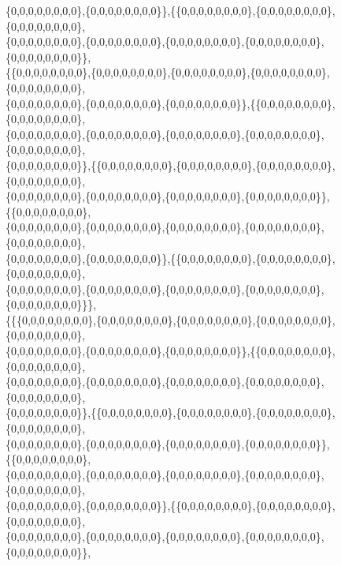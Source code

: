 \documentclass[a4paper,11pt]{jbook}
\theoremstyle{plain}
\theoremstyle{definition}
\theoremstyle{remark}
\theoremstyle{proof}
\numberwithin{equation}{section}
\begin{document}
\begin{doublespace}
\{0,0,0,0,0,0,0,0\},\{0,0,0,0,0,0,0,0\}\},\{\{0,0,0,0,0,0,0,0\},\{0,0,0,0,0,0,0,0\},\{0,0,0,0,0,0,0,0\}, \\
\{0,0,0,0,0,0,0,0\},\{0,0,0,0,0,0,0,0\},\{0,0,0,0,0,0,0,0\},\{0,0,0,0,0,0,0,0\},\{0,0,0,0,0,0,0,0\}\},\\
\{\{0,0,0,0,0,0,0,0\},\{0,0,0,0,0,0,0,0\},\{0,0,0,0,0,0,0,0\},\{0,0,0,0,0,0,0,0\},\{0,0,0,0,0,0,0,0\}, \\
\{0,0,0,0,0,0,0,0\},\{0,0,0,0,0,0,0,0\},\{0,0,0,0,0,0,0,0\}\},\{\{0,0,0,0,0,0,0,0\},\{0,0,0,0,0,0,0,0\}, \\
\{0,0,0,0,0,0,0,0\},\{0,0,0,0,0,0,0,0\},\{0,0,0,0,0,0,0,0\},\{0,0,0,0,0,0,0,0\},\{0,0,0,0,0,0,0,0\},\\
\{0,0,0,0,0,0,0,0\}\},\{\{0,0,0,0,0,0,0,0\},\{0,0,0,0,0,0,0,0\},\{0,0,0,0,0,0,0,0\},\{0,0,0,0,0,0,0,0\}, \\
\{0,0,0,0,0,0,0,0\},\{0,0,0,0,0,0,0,0\},\{0,0,0,0,0,0,0,0\},\{0,0,0,0,0,0,0,0\}\},\{\{0,0,0,0,0,0,0,0\}, \\
\{0,0,0,0,0,0,0,0\},\{0,0,0,0,0,0,0,0\},\{0,0,0,0,0,0,0,0\},\{0,0,0,0,0,0,0,0\},\{0,0,0,0,0,0,0,0\},\\
\{0,0,0,0,0,0,0,0\},\{0,0,0,0,0,0,0,0\}\},\{\{0,0,0,0,0,0,0,0\},\{0,0,0,0,0,0,0,0\},\{0,0,0,0,0,0,0,0\}, \\
\{0,0,0,0,0,0,0,0\},\{0,0,0,0,0,0,0,0\},\{0,0,0,0,0,0,0,0\},\{0,0,0,0,0,0,0,0\},\{0,0,0,0,0,0,0,0\}\}\}, \\
\{\{\{0,0,0,0,0,0,0,0\},\{0,0,0,0,0,0,0,0\},\{0,0,0,0,0,0,0,0\},\{0,0,0,0,0,0,0,0\},\{0,0,0,0,0,0,0,0\}, \\
\{0,0,0,0,0,0,0,0\},\{0,0,0,0,0,0,0,0\},\{0,0,0,0,0,0,0,0\}\},\{\{0,0,0,0,0,0,0,0\},\{0,0,0,0,0,0,0,0\}, \\
\{0,0,0,0,0,0,0,0\},\{0,0,0,0,0,0,0,0\},\{0,0,0,0,0,0,0,0\},\{0,0,0,0,0,0,0,0\},\{0,0,0,0,0,0,0,0\},\\
\{0,0,0,0,0,0,0,0\}\},\{\{0,0,0,0,0,0,0,0\},\{0,0,0,0,0,0,0,0\},\{0,0,0,0,0,0,0,0\},\{0,0,0,0,0,0,0,0\}, \\
\{0,0,0,0,0,0,0,0\},\{0,0,0,0,0,0,0,0\},\{0,0,0,0,0,0,0,0\},\{0,0,0,0,0,0,0,0\}\},\{\{0,0,0,0,0,0,0,0\}, \\
\{0,0,0,0,0,0,0,0\},\{0,0,0,0,0,0,0,0\},\{0,0,0,0,0,0,0,0\},\{0,0,0,0,0,0,0,0\},\{0,0,0,0,0,0,0,0\},\\
\{0,0,0,0,0,0,0,0\},\{0,0,0,0,0,0,0,0\}\},\{\{0,0,0,0,0,0,0,0\},\{0,0,0,0,0,0,0,0\},\{0,0,0,0,0,0,0,0\}, \\
\{0,0,0,0,0,0,0,0\},\{0,0,0,0,0,0,0,0\},\{0,0,0,0,0,0,0,0\},\{0,0,0,0,0,0,0,0\},\{0,0,0,0,0,0,0,0\}\}, \\

\end{doublespace}
\end{document}
